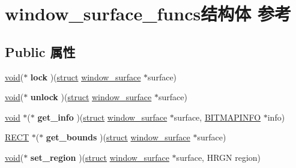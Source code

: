 \hypertarget{structwindow__surface__funcs}{}\section{window\+\_\+surface\+\_\+funcs结构体 参考}
\label{structwindow__surface__funcs}
\subsection*{Public 属性}
\begin{DoxyCompactItemize}
\item 
\mbox{\label{structwindow__surface__funcs_ab73e2e4ac230b09d8324ce96915ae398}} 
\hyperlink{interfacevoid}{void}($\ast$ {\bfseries lock} )(\hyperlink{interfacestruct}{struct} \hyperlink{structwindow__surface}{window\+\_\+surface} $\ast$surface)
\item 
\mbox{\label{structwindow__surface__funcs_afdccfbe6e9966468193502067ca82fc1}} 
\hyperlink{interfacevoid}{void}($\ast$ {\bfseries unlock} )(\hyperlink{interfacestruct}{struct} \hyperlink{structwindow__surface}{window\+\_\+surface} $\ast$surface)
\item 
\mbox{\label{structwindow__surface__funcs_a433fd31a7448b11eb2b66cedc8200ab8}} 
\hyperlink{interfacevoid}{void} $\ast$($\ast$ {\bfseries get\+\_\+info} )(\hyperlink{interfacestruct}{struct} \hyperlink{structwindow__surface}{window\+\_\+surface} $\ast$surface, \hyperlink{structtag_b_i_t_m_a_p_i_n_f_o}{B\+I\+T\+M\+A\+P\+I\+N\+FO} $\ast$info)
\item 
\mbox{\label{structwindow__surface__funcs_abff075fcfd08379af0f3a5d9ad988a46}} 
\hyperlink{structtag_r_e_c_t}{R\+E\+CT} $\ast$($\ast$ {\bfseries get\+\_\+bounds} )(\hyperlink{interfacestruct}{struct} \hyperlink{structwindow__surface}{window\+\_\+surface} $\ast$surface)
\item 
\mbox{\label{structwindow__surface__funcs_af8967c643f56c70cee406348f750d024}} 
\hyperlink{interfacevoid}{void}($\ast$ {\bfseries set\+\_\+region} )(\hyperlink{interfacestruct}{struct} \hyperlink{structwindow__surface}{window\+\_\+surface} $\ast$surface, H\+R\+GN region)

\end{DoxyCompactItemize}

